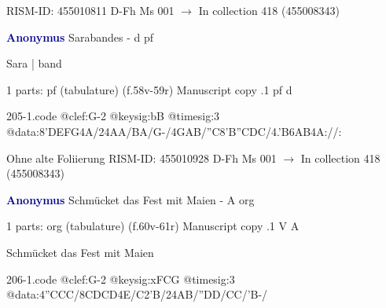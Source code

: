 \documentclass[twocolumn]{book}
\begin{document}
\newline RISM-ID: 455010811
\newline D-Fh  Ms 001
\newline $\rightarrow$ In collection 418 (455008343)
      
\newline \par \vspace{7pt} \textcolor{darkblue}{\textbf{Anonymus  }}
\newline Sarabandes - d
\newline pf
\newline \begin{itshape}[f.58v, at left:] Sara | band\end{itshape} 
\newline \textcolor{darkblue}{}  1 parts: pf (tabulature)  (f.58v-59r)
\newline Manuscript copy
.1  pf  d  
\begin{filecontents*}{205-1.code}
@clef:G-2
@keysig:bB
@timesig:3
@data:{8'DEFG}4A/24AA/BA/G-/4GAB/''C{8'B''CDC}/4.'B{6AB}4A://:
\end{filecontents*}
\newline
%

\newline Ohne alte Foliierung
\newline RISM-ID: 455010928
\newline D-Fh  Ms 001
\newline $\rightarrow$ In collection 418 (455008343)
      
\newline \par \vspace{7pt} \textcolor{darkblue}{\textbf{Anonymus  }}
\newline Schmücket das Fest mit Maien - A
\newline org
\newline \begin{itshape}\end{itshape} 
\newline \textcolor{darkblue}{}  1 parts: org (tabulature)  (f.60v-61r)
\newline Manuscript copy
.1  V  A
\newline \begin{footnotesize} Schmücket das Fest mit Maien \end{footnotesize}  
\begin{filecontents*}{206-1.code}
@clef:G-2
@keysig:xFCG
@timesig:3
@data:4''CCC/{8CDCD}4E/C2'B/24AB/''DD/CC/'B-/
\end{filecontents*}
\newline
%
\end{document}
